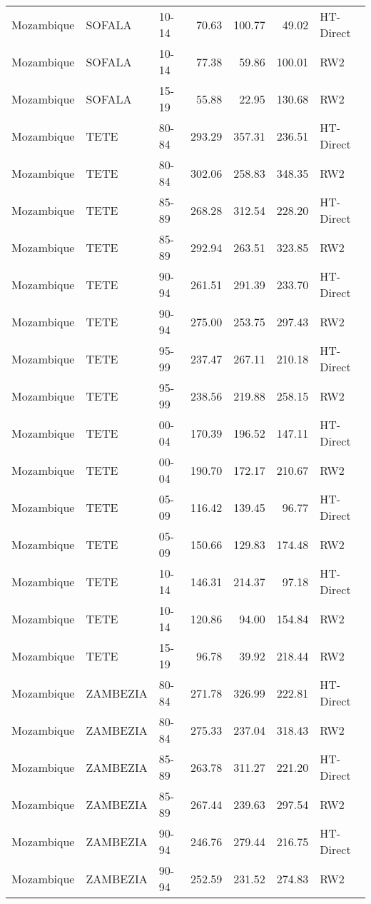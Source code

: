 \begin{longtable}{lllrrrl}
  Mozambique & SOFALA & 10-14 & 70.63 & 100.77 & 49.02 & HT-Direct \\ 
  Mozambique & SOFALA & 10-14 & 77.38 & 59.86 & 100.01 & RW2 \\ 
  Mozambique & SOFALA & 15-19 & 55.88 & 22.95 & 130.68 & RW2 \\ 
  Mozambique & TETE & 80-84 & 293.29 & 357.31 & 236.51 & HT-Direct \\ 
  Mozambique & TETE & 80-84 & 302.06 & 258.83 & 348.35 & RW2 \\ 
  Mozambique & TETE & 85-89 & 268.28 & 312.54 & 228.20 & HT-Direct \\ 
  Mozambique & TETE & 85-89 & 292.94 & 263.51 & 323.85 & RW2 \\ 
  Mozambique & TETE & 90-94 & 261.51 & 291.39 & 233.70 & HT-Direct \\ 
  Mozambique & TETE & 90-94 & 275.00 & 253.75 & 297.43 & RW2 \\ 
  Mozambique & TETE & 95-99 & 237.47 & 267.11 & 210.18 & HT-Direct \\ 
  Mozambique & TETE & 95-99 & 238.56 & 219.88 & 258.15 & RW2 \\ 
  Mozambique & TETE & 00-04 & 170.39 & 196.52 & 147.11 & HT-Direct \\ 
  Mozambique & TETE & 00-04 & 190.70 & 172.17 & 210.67 & RW2 \\ 
  Mozambique & TETE & 05-09 & 116.42 & 139.45 & 96.77 & HT-Direct \\ 
  Mozambique & TETE & 05-09 & 150.66 & 129.83 & 174.48 & RW2 \\ 
  Mozambique & TETE & 10-14 & 146.31 & 214.37 & 97.18 & HT-Direct \\ 
  Mozambique & TETE & 10-14 & 120.86 & 94.00 & 154.84 & RW2 \\ 
  Mozambique & TETE & 15-19 & 96.78 & 39.92 & 218.44 & RW2 \\ 
  Mozambique & ZAMBEZIA & 80-84 & 271.78 & 326.99 & 222.81 & HT-Direct \\ 
  Mozambique & ZAMBEZIA & 80-84 & 275.33 & 237.04 & 318.43 & RW2 \\ 
  Mozambique & ZAMBEZIA & 85-89 & 263.78 & 311.27 & 221.20 & HT-Direct \\ 
  Mozambique & ZAMBEZIA & 85-89 & 267.44 & 239.63 & 297.54 & RW2 \\ 
  Mozambique & ZAMBEZIA & 90-94 & 246.76 & 279.44 & 216.75 & HT-Direct \\ 
  Mozambique & ZAMBEZIA & 90-94 & 252.59 & 231.52 & 274.83 & RW2 \\ 

\end{longtable}
